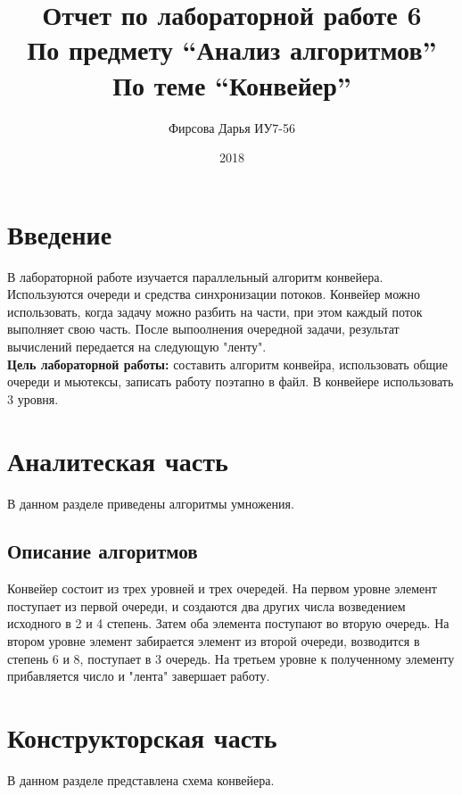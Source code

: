 \documentclass[12pt]{article}
\title{Отчет по лабораторной работе 6 \\ 
	По предмету “Анализ алгоритмов” \\
	По теме “Конвейер”
}
\date{2018}
\author{Фирсова Дарья ИУ7-56}
\begin{document}
  
	\maketitle  
	\newpage
	\section*{Введение}
	В лабораторной работе изучается параллельный алгоритм конвейера. Используются очереди и средства синхронизации потоков. Конвейер можно использовать, когда задачу можно разбить на части, при этом каждый поток выполняет свою часть. После выпоолнения очередной задачи, результат вычислений передается на следующую "ленту". \\
	\textbf{Цель лабораторной работы:} составить алгоритм конвейра, использовать общие очереди и мьютексы, записать работу поэтапно в файл. В конвейере использовать 3 уровня.\\
\newpage

\section{Аналитеская часть}
В данном разделе приведены алгоритмы умножения.
\subsection{Описание алгоритмов}
Конвейер состоит из трех уровней и трех очередей. На первом уровне элемент поступает из первой очереди, и создаются два других числа возведением исходного в 2 и 4 степень. Затем оба элемента поступают во вторую очередь. На втором уровне элемент забирается элемент из второй очереди, возводится в степень 6 и 8, поступает в 3 очередь. На третьем уровне к полученному элементу прибавляется число и "лента" завершает работу.
\newpage
\section{Конструкторская часть}
В данном разделе представлена схема конвейера.
\end{document}
